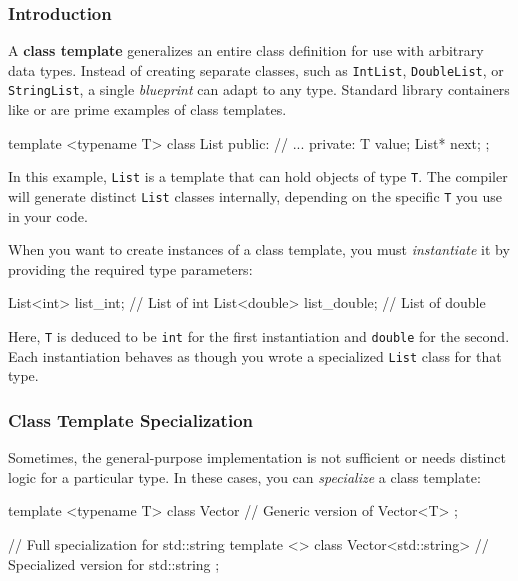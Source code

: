 \subsubsection{Introduction}

A \textbf{class template} generalizes an entire class definition for use with arbitrary data types. Instead of creating separate classes, such as \texttt{IntList}, \texttt{DoubleList}, or \texttt{StringList}, a single \textit{blueprint} can adapt to any type. Standard library containers like  or  are prime examples of class templates.

\begin{codeblock}[language=C++]
template <typename T>
class List {
public:
    // ...
private:
    T value;
    List* next;
};
\end{codeblock}

In this example, \texttt{List} is a template that can hold objects of type \texttt{T}. The compiler will generate distinct \texttt{List} classes internally, depending on the specific \texttt{T} you use in your code.

When you want to create instances of a class template, you must \emph{instantiate} it by providing the required type parameters:

\begin{codeblock}[language=C++, numbers=none]
List<int> list_int;       // List of int
List<double> list_double; // List of double
\end{codeblock}

Here, \texttt{T} is deduced to be \texttt{int} for the first instantiation and \texttt{double} for the second. Each instantiation behaves as though you wrote a specialized \texttt{List} class for that type.

\subsubsection{Class Template Specialization}

Sometimes, the general-purpose implementation is not sufficient or needs distinct logic for a particular type. In these cases, you can \emph{specialize} a class template:

\begin{codeblock}[language=C++]
template <typename T>
class Vector {
    // Generic version of Vector<T>
};

// Full specialization for std::string
template <>
class Vector<std::string> {
    // Specialized version for std::string
};
\end{codeblock}

